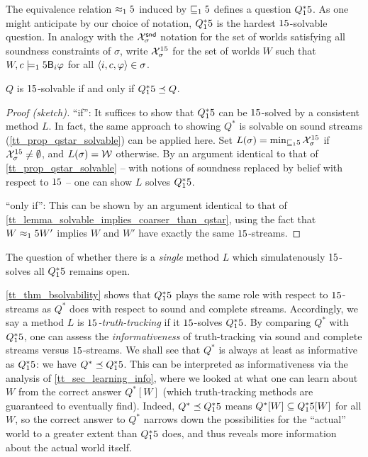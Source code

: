 The equivalence relation $\approx_15$ induced by $\sqsubseteq_15$ defines a question
$Q^*_15$. As one might anticipate by our choice of notation, $Q^*_15$ is the
hardest $15$-solvable question. In analogy with the $\mathcal{X}^{\mathsf{snd}}_\sigma$ notation for
the set of worlds satisfying all soundness constraints of $\sigma$, write
$\mathcal{X}^{15}_\sigma$ for the set of worlds $W$ such that $W, c \models_15 \mathsf{B}_i\varphi$
for all $\langle {i, c, \varphi} \rangle \in \sigma$.

\begin{theorem}
    \label{tt_thm_bsolvability}
    $Q$ is $15$-solvable if and only if $Q^*_15 \preceq Q$.
\end{theorem}

\begin{proof}[Proof (sketch)]
    ``if'': It suffices to show that $Q^*_15$ can be $15$-solved by a consistent
    method $L$. In fact, the same approach to showing $Q^*$ is solvable on
    sound streams (\cref{tt_prop_qstar_solvable}) can be applied here. Set
    $L(\sigma) = \min_{\sqsubseteq_15}{\mathcal{X}^{15}_\sigma}$ if $\mathcal{X}^{15}_\sigma \ne
    \emptyset$, and $L(\sigma) = \mathcal{W}$ otherwise. By an argument identical
    to that of \cref{tt_prop_qstar_solvable} -- with notions of soundness
    replaced by belief with respect to $15$ -- one can show $L$ solves $Q^*_15$.

    ``only if'': This can be shown by an argument identical to that of
    \cref{tt_lemma_solvable_implies_coarser_than_qstar}, using the fact that $W
    \approx_15 W'$ implies $W$ and $W'$ have exactly the same $15$-streams.
\end{proof}

The question of whether there is a \emph{single} method $L$ which
simulatenously $15$-solves all $Q^*_15$ remains open.

\cref{tt_thm_bsolvability} shows that $Q^*_15$ plays the same role with respect
to $15$-streams as $Q^*$ does with respect to sound and complete streams.
Accordingly, we say a method $L$ is \emph{$15$-truth-tracking} if it
$15$-solves $Q^*_15$. By comparing $Q^*$ with $Q^*_15$, one can assess the
\emph{informativeness} of truth-tracking via sound and complete streams versus
$15$-streams. We shall see that $Q^*$ is always at least as informative as
$Q^*_15$: we have $Q^* \preceq Q^*_15$. This can be interpreted as
informativeness via the analysis of \cref{tt_sec_learning_info}, where we
looked at what one can learn about $W$ from the correct answer $Q^*[W]$ (which
truth-tracking methods are guaranteed to eventually find).  Indeed, $Q^*
\preceq Q^*_15$ means $Q^*[W] \subseteq Q^*_15[W]$ for all $W$, so the correct
answer to $Q^*$ narrows down the possibilities for the ``actual'' world to a
greater extent than $Q^*_15$ does, and thus reveals more information about the
actual world itself.

